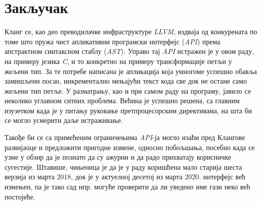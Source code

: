 \documentclass[a4paper]{article}
\begin{document}
\section{Закључак}

Кланг се, као део преводилачке инфраструктуре \textit{LLVM}, издваја од конкурената по томе што пружа чист апликативни програмски интерфејс (\textit{API}) према апстрактном синтаксном стаблу (\textit{AST}). Управо тај \textit{API} истражен је у овом раду, на примеру језика \textit{C}, и то конкретно на примеру трансформације петљи у жељени тип. За те потребе написана је апликација која умногоме успешно обавља замишљени посао, инкрементално мењајући текст кода све док не остане само жељени тип петље. У разматрању, као и при самом раду на програму, јавило се неколико углавном ситних проблема. Већина је успешно решена, са главним изузетком када је у питању руковање претпроцесорским директивама, на шта би се могло усмерити даље истраживање.

Такође би се са примећеним ограничењима \textit{API}-ја могло изаћи пред Клангове развијаоце и предложити пригодне измене, односно побољшања, посебно када се узме у обзир да је познато да су ажурни и да радо прихватају корисничке сугестије. Штавише, чињеница је да је у раду коришћена мало старија шеста верзија из марта 2018, док је у актуелној десетој из марта 2020. интерфејс већ измењен, па је тако сад нпр. могуће проверити да ли уведено име гази неко већ постојеће.

\newpage
{}
\appendix


\end{document}
